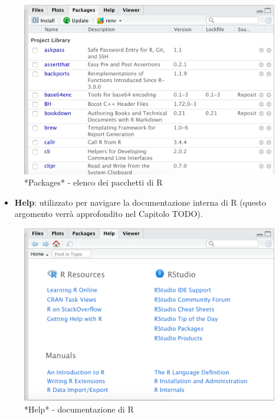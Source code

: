 \documentclass[
]{book}
\providecommand{\tightlist}{%
  \setlength{\itemsep}{0pt}\setlength{\parskip}{0pt}}
\begin{document}
\begin{figure}

{\centering \includegraphics[width=0.6\linewidth]{images/packages} 

}

\caption{*Packages* - elenco dei pacchetti di R}\label{fig:packages}
\end{figure}

\begin{itemize}
\tightlist
\item
  \textbf{Help}: utilizzato per navigare la documentazione interna di R (questo argomento verrà approfondito nel Capitolo TODO).
\end{itemize}

\begin{figure}

{\centering \includegraphics[width=0.6\linewidth]{images/help} 

}

\caption{*Help* -  documentazione di R}\label{fig:help}
\end{figure}
\end{document}
